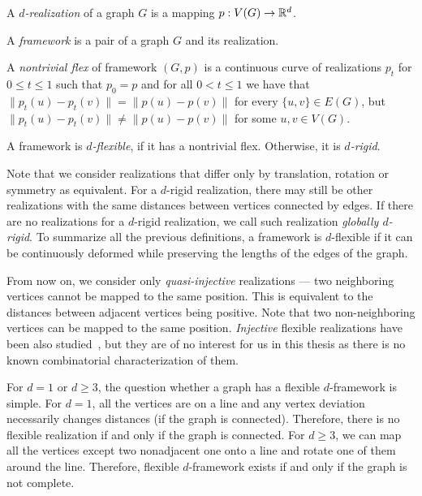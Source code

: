 %
\begin{definition}[\( d \)-realization]
	A \emph{\( d \)-realization} of a graph \( G \) is a mapping \( p: V(G) \to \mathbb{R}^d \).
\end{definition}
%
\begin{definition}[Framework]
	A \emph{framework} is a pair of a graph \( G \) and its realization.
\end{definition}
%
\begin{definition}
	A \emph{nontrivial flex} of framework \( (G, p) \) is a continuous curve of realizations \( p_t \)
	for \( 0 \le t \le 1\) such that
	\( p_0 = p \) and for all \( 0 < t \le 1 \)
	we have that
	\( \|p_t(u) - p_t(v)\| = \|p(u) - p(v)\|\) for every \( \{u, v\} \in E(G) \),
	but \( \|p_t(u) - p_t(v)\| \ne \|p(u) - p(v)\| \) for some \( u, v \in V (G) \).
\end{definition}
%
\begin{definition}
	A framework is \emph{\( d \)-flexible}, if it has a nontrivial flex.
	Otherwise, it is \emph{\( d \)-rigid}.
\end{definition}
%
Note that we consider realizations that differ only by translation,
rotation or symmetry as equivalent.
%
For a \( d \)-rigid realization, there may still be other realizations
with the same distances between vertices connected by edges.
%
If there are no realizations for a \( d \)-rigid realization,
we call such realization \emph{globally \( d \)-rigid}.
To summarize all the previous definitions,
a framework is \( d \)-flexible if it can be continuously deformed
while preserving the lengths of the edges of the graph.

From now on, we consider only \emph{quasi-injective} realizations ---
two neighboring vertices cannot be mapped to the same position.
This is equivalent to the distances between adjacent vertices being positive.
Note that two non-neighboring vertices can be mapped to the same position.
\emph{Injective} flexible realizations have been also studied~\cite{injective_realizations},
but they are of no interest for us in this thesis
as there is no known combinatorial characterization of them.

For \( d = 1 \) or \( d \ge 3 \),
the question whether a graph has a flexible \( d \)-framework is simple.
%
For \( d = 1 \), all the vertices are on a line
and any vertex deviation necessarily changes distances (if the graph is connected).
Therefore, there is no flexible realization if and only if the graph is connected.
%
For \( d \ge 3 \), we can map all the vertices except two nonadjacent one
onto a line and rotate one of them around the line.
Therefore, flexible \( d \)-framework exists if and only if the graph is not complete.

